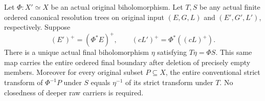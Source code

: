 \begin{theorem}
\label{hir:original-canonical-ordered-closure-choice}
\leanok
Let $\Phi:X'\simeq X$ be an actual original biholomorphism. Let $T,S$
be any actual finite ordered canonical resolution trees on original
input $(E,G,L)$ and $(E',G',L')$, respectively. Suppose
\[
 (E')^+=(\Phi^*E)^+,
 \qquad (cL')^+=\Phi^*((cL)^+).
\]
There is a unique actual final biholomorphism $\eta$ satisfying
$T\eta=\Phi S$. This same map carries the entire ordered final boundary
after deletion of precisely empty members. Moreover for every original
subset $P\subseteq X$, the entire conventional strict transform of
$\Phi^{-1}P$ under $S$ equals $\eta^{-1}$ of its strict transform under
$T$. No closedness of deeper raw carriers is required.
\end{theorem}

